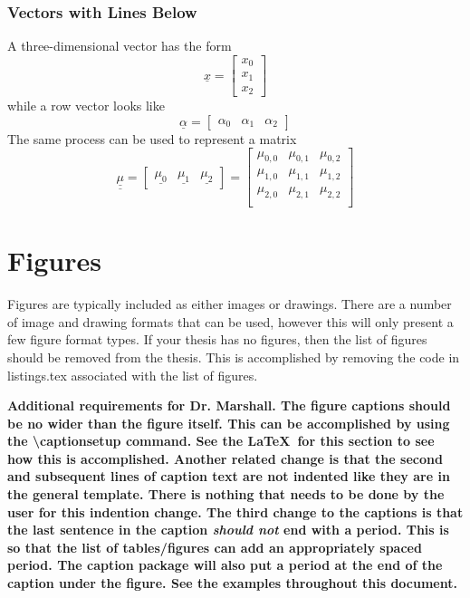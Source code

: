 \subsubsection{Vectors with Lines Below}
    A three-dimensional vector has the form
    \begin{equation}
        \underline{x}
            =\begin{bmatrix}
                x_0 \\ x_1 \\ x_2
             \end{bmatrix}
    \end{equation}
    while a row vector looks like
    \begin{equation}
        \underline{\alpha}
            =\begin{bmatrix}
                \alpha_0 & \alpha_1 & \alpha_2
             \end{bmatrix}
    \end{equation}
    The same process can be used to represent a matrix
    \begin{equation}
        \underline{\underline{\mu}}
            =\begin{bmatrix}
                \underline{\mu_0} & \underline{\mu_1} & \underline{\mu_2}
             \end{bmatrix}
            =\begin{bmatrix}
                \mu_{0,0} & \mu_{0,1} & \mu_{0,2} \\
                \mu_{1,0} & \mu_{1,1} & \mu_{1,2} \\
                \mu_{2,0} & \mu_{2,1} & \mu_{2,2} \\
             \end{bmatrix}
    \end{equation}

\section{Figures} \label{sec:Figures}
    Figures are typically included as either images or drawings.
    There are a number of image and drawing formats that can be used, however this will only present a few figure format types.
    If your thesis has no figures, then the list of figures should be removed from the thesis.
    This is accomplished by removing the code in listings.tex associated with the list of figures.

    \textbf{
    Additional requirements for Dr. Marshall.
    The figure captions should be no wider than the figure itself.
    This can be accomplished by using the \textbackslash captionsetup command.
    See the \LaTeX\ for this section to see how this is accomplished.
    Another related change is that the second and subsequent lines of caption text are not indented like they are in the general template.
    There is nothing that needs to be done by the user for this indention change.
    The third change to the captions is that the last sentence in the caption \emph{should not} end with a period.
    This is so that the list of tables/figures can add an appropriately spaced period.
    The caption package will also put a period at the end of the caption under the figure.
    See the examples throughout this document.
    }

